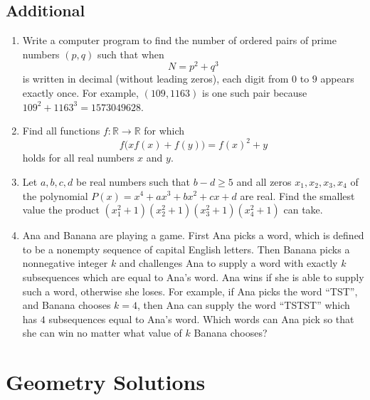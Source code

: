 \documentclass[12pt]{article}
\begin{document}
    \subsection{Additional}
      \begin{enumerate}[label=\textbf{\arabic*.}]
        \item Write a computer program to find the number of ordered pairs of prime numbers $(p,q)$ such that when
          \[
            N = p^2 + q^3
          \]
          is written in decimal (without leading zeros), each digit from $0$ to $9$ appears exactly once. For example, $(109,1163)$ is one
          such pair because $109^2 + 1163^3 = 1573049628$.
        \item Find all functions $f:\mathbb{R}\to\mathbb{R}$ for which
          \[
            f\big(xf(x)+f(y)\big)=f(x)^2+y
          \]
          holds for all real numbers $x$ and $y$.
        \item Let $a,b,c,d$ be real numbers such that $b-d\ge 5$ and all zeros $x_1,x_2,x_3,x_4$ of the polynomial $P(x)=x^4+ax^3+bx^2+cx+d$ are 
          real. Find the smallest value the product $(x_1^2+1)(x_2^2+1)(x_3^2+1)(x_4^2+1)$ can take.
        \item Ana and Banana are playing a game. First Ana picks a word, which is defined to be a nonempty sequence of capital English
          letters. Then Banana picks a nonnegative integer $k$ and challenges Ana to supply a word with exactly $k$ subsequences which are 
          equal to Ana's word. Ana wins if she is able to supply such a word, otherwise she loses. For example, if Ana picks the word “TST”,
          and Banana chooses $k=4$, then Ana can supply the word “TSTST” which has $4$ subsequences equal to Ana's word. Which words can Ana 
          pick so that she can win no matter what value of $k$ Banana chooses?
      \end{enumerate}

    \clearpage

  \section{\textsf{Geometry Solutions}}
    \
\end{document}
